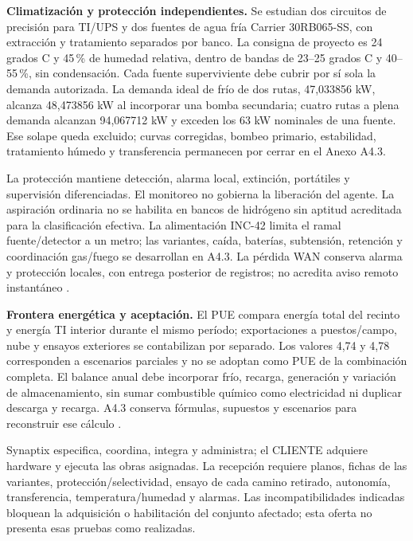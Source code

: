 \textbf{Climatización y protección independientes.} Se estudian dos circuitos de precisión para TI/UPS y dos fuentes de agua fría Carrier 30RB065-SS, con extracción y tratamiento separados por banco. La consigna de proyecto es 24 grados C y 45\,\% de humedad relativa, dentro de bandas de 23--25 grados C y 40--55\,\%, sin condensación. Cada fuente superviviente debe cubrir por sí sola la demanda autorizada. La demanda ideal de frío de dos rutas, 47,033856 kW, alcanza 48,473856 kW al incorporar una bomba secundaria; cuatro rutas a plena demanda alcanzan 94,067712 kW y exceden los 63 kW nominales de una fuente. Ese solape queda excluido; curvas corregidas, bombeo primario, estabilidad, tratamiento húmedo y transferencia permanecen por cerrar en el Anexo A4.3.

La protección mantiene detección, alarma local, extinción, portátiles y supervisión diferenciadas. El monitoreo no gobierna la liberación del agente. La aspiración ordinaria no se habilita en bancos de hidrógeno sin aptitud acreditada para la clasificación efectiva. La alimentación INC-42 limita el ramal fuente/detector a un metro; las variantes, caída, baterías, subtensión, retención y coordinación gas/fuego se desarrollan en A4.3. La pérdida WAN conserva alarma y protección locales, con entrega posterior de registros; no acredita aviso remoto instantáneo \parencite[RT-06.16--19, p.~16]{pucv-transversal}.

\textbf{Frontera energética y aceptación.} El PUE compara energía total del recinto y energía TI interior durante el mismo período; exportaciones a puestos/campo, nube y ensayos exteriores se contabilizan por separado. Los valores 4,74 y 4,78 corresponden a escenarios parciales y no se adoptan como PUE de la combinación completa. El balance anual debe incorporar frío, recarga, generación y variación de almacenamiento, sin sumar combustible químico como electricidad ni duplicar descarga y recarga. A4.3 conserva fórmulas, supuestos y escenarios para reconstruir ese cálculo \parencite[RT-06.11, p.~15; RT-15.04, p.~28]{pucv-transversal}.

Synaptix especifica, coordina, integra y administra; el CLIENTE adquiere hardware y ejecuta las obras asignadas. La recepción requiere planos, fichas de las variantes, protección/selectividad, ensayo de cada camino retirado, autonomía, transferencia, temperatura/humedad y alarmas. Las incompatibilidades indicadas bloquean la adquisición o habilitación del conjunto afectado; esta oferta no presenta esas pruebas como realizadas.
